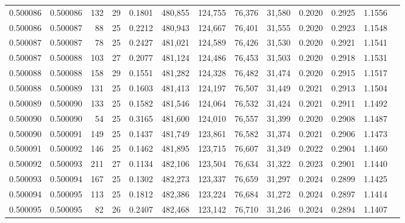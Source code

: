 \begin{tabular}{rrrrrrrrrrrrr}
0.500086 & 0.500086 & 132 &  29 &                                     0.1801 & 480,855 & 124,755 &  76,376 &  31,580 & 0.2020 & 0.2925 & 1.1556 \\
0.500086 & 0.500087 &  88 &  25 &                                     0.2212 & 480,943 & 124,667 &  76,401 &  31,555 & 0.2020 & 0.2923 & 1.1548 \\
0.500087 & 0.500087 &  78 &  25 &                                     0.2427 & 481,021 & 124,589 &  76,426 &  31,530 & 0.2020 & 0.2921 & 1.1541 \\
0.500087 & 0.500088 & 103 &  27 &                                     0.2077 & 481,124 & 124,486 &  76,453 &  31,503 & 0.2020 & 0.2918 & 1.1531 \\
0.500088 & 0.500088 & 158 &  29 &                                     0.1551 & 481,282 & 124,328 &  76,482 &  31,474 & 0.2020 & 0.2915 & 1.1517 \\
0.500088 & 0.500089 & 131 &  25 &                                     0.1603 & 481,413 & 124,197 &  76,507 &  31,449 & 0.2021 & 0.2913 & 1.1504 \\
0.500089 & 0.500090 & 133 &  25 &                                     0.1582 & 481,546 & 124,064 &  76,532 &  31,424 & 0.2021 & 0.2911 & 1.1492 \\
0.500090 & 0.500090 &  54 &  25 &                                     0.3165 & 481,600 & 124,010 &  76,557 &  31,399 & 0.2020 & 0.2908 & 1.1487 \\
0.500090 & 0.500091 & 149 &  25 &                                     0.1437 & 481,749 & 123,861 &  76,582 &  31,374 & 0.2021 & 0.2906 & 1.1473 \\
0.500091 & 0.500092 & 146 &  25 &                                     0.1462 & 481,895 & 123,715 &  76,607 &  31,349 & 0.2022 & 0.2904 & 1.1460 \\
0.500092 & 0.500093 & 211 &  27 &                                     0.1134 & 482,106 & 123,504 &  76,634 &  31,322 & 0.2023 & 0.2901 & 1.1440 \\
0.500093 & 0.500094 & 167 &  25 &                                     0.1302 & 482,273 & 123,337 &  76,659 &  31,297 & 0.2024 & 0.2899 & 1.1425 \\
0.500094 & 0.500095 & 113 &  25 &                                     0.1812 & 482,386 & 123,224 &  76,684 &  31,272 & 0.2024 & 0.2897 & 1.1414 \\
0.500095 & 0.500095 &  82 &  26 &                                     0.2407 & 482,468 & 123,142 &  76,710 &  31,246 & 0.2024 & 0.2894 & 1.1407 \\

\end{tabular}
